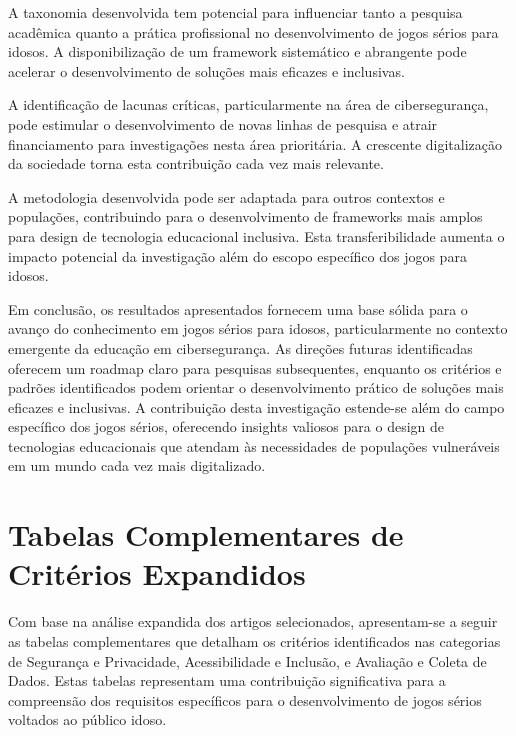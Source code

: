 \begin{table}[H]
A taxonomia desenvolvida tem potencial para influenciar tanto a pesquisa acadêmica quanto a prática profissional no desenvolvimento de jogos sérios para idosos. A disponibilização de um framework sistemático e abrangente pode acelerar o desenvolvimento de soluções mais eficazes e inclusivas.

A identificação de lacunas críticas, particularmente na área de cibersegurança, pode estimular o desenvolvimento de novas linhas de pesquisa e atrair financiamento para investigações nesta área prioritária. A crescente digitalização da sociedade torna esta contribuição cada vez mais relevante.

A metodologia desenvolvida pode ser adaptada para outros contextos e populações, contribuindo para o desenvolvimento de frameworks mais amplos para design de tecnologia educacional inclusiva. Esta transferibilidade aumenta o impacto potencial da investigação além do escopo específico dos jogos para idosos.

Em conclusão, os resultados apresentados fornecem uma base sólida para o avanço do conhecimento em jogos sérios para idosos, particularmente no contexto emergente da educação em cibersegurança. As direções futuras identificadas oferecem um roadmap claro para pesquisas subsequentes, enquanto os critérios e padrões identificados podem orientar o desenvolvimento prático de soluções mais eficazes e inclusivas. A contribuição desta investigação estende-se além do campo específico dos jogos sérios, oferecendo insights valiosos para o design de tecnologias educacionais que atendam às necessidades de populações vulneráveis em um mundo cada vez mais digitalizado.



\section{Tabelas Complementares de Critérios Expandidos}
\label{sec:tabelas_complementares}

Com base na análise expandida dos artigos selecionados, apresentam-se a seguir as tabelas complementares que detalham os critérios identificados nas categorias de Segurança e Privacidade, Acessibilidade e Inclusão, e Avaliação e Coleta de Dados. Estas tabelas representam uma contribuição significativa para a compreensão dos requisitos específicos para o desenvolvimento de jogos sérios voltados ao público idoso.


\end{table}

